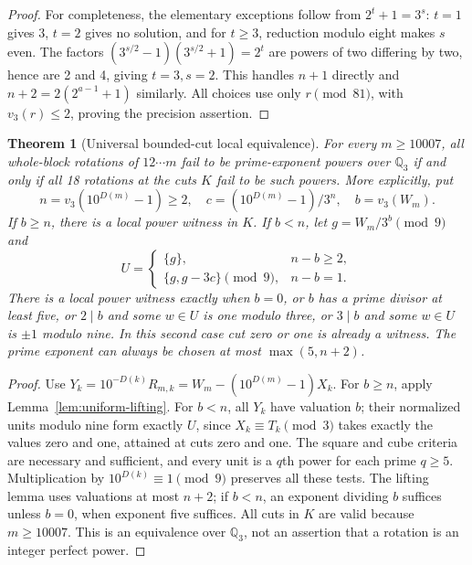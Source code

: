 \documentclass[10pt]{article}
\newtheorem{theorem}{Theorem}
\begin{document}
\begin{proof}
For completeness, the elementary exceptions follow from
$2^t+1=3^s$: $t=1$ gives 3, $t=2$ gives no solution, and for $t\ge3$,
reduction modulo eight makes $s$ even. The factors
$(3^{s/2}-1)(3^{s/2}+1)=2^t$ are powers of two differing by two,
hence are 2 and 4, giving $t=3,s=2$.
This handles $n+1$ directly and $n+2=2(2^{a-1}+1)$ similarly.
All choices use only $r\pmod{81}$, with $v_3(r)\le2$, proving
the precision assertion.
\end{proof}

\begin{theorem}[Universal bounded-cut local equivalence]\label{thm:universal-cuts}
For every $m\ge10007$, all whole-block rotations of $12\cdots m$
fail to be prime-exponent powers over $\mathbb Q_3$ if and only if
all 18 rotations at the cuts $K$ fail to be such powers.
More explicitly, put
\[
 n=v_3(10^{D(m)}-1)\ge2,\quad
 c=(10^{D(m)}-1)/3^n,\quad b=v_3(W_m).
\]
If $b\ge n$, there is a local power witness in $K$.
If $b<n$, let $g=W_m/3^b\pmod9$ and
\[
 U=\begin{cases}\{g\},&n-b\ge2,\\
 \{g,g-3c\}\pmod9,&n-b=1.
 \end{cases}
\]
There is a local power witness exactly when $b=0$, or $b$ has a
prime divisor at least five, or $2\mid b$ and some $w\in U$ is one
modulo three, or $3\mid b$ and some $w\in U$ is $\pm1$ modulo nine.
In this second case cut zero or one is already a witness.
The prime exponent can always be chosen at most $\max(5,n+2)$.
\end{theorem}
\begin{proof}
Use $Y_k=10^{-D(k)}R_{m,k}=W_m-(10^{D(m)}-1)X_k$.
For $b\ge n$, apply Lemma~\ref{lem:uniform-lifting}.
For $b<n$, all $Y_k$ have valuation $b$; their normalized units
modulo nine form exactly $U$, since $X_k\equiv T_k\pmod3$
takes exactly the values zero and one, attained at cuts zero and one.
The square and cube criteria are necessary and sufficient, and every
unit is a $q$th power for each prime $q\ge5$.
Multiplication by $10^{D(k)}\equiv1\pmod9$ preserves all these tests.
The lifting lemma uses valuations at most $n+2$; if $b<n$, an exponent
dividing $b$ suffices unless $b=0$, when exponent five suffices.
All cuts in $K$ are valid because $m\ge10007$.
This is an equivalence over $\mathbb Q_3$, not an assertion that a
rotation is an integer perfect power.
\end{proof}
\end{document}
